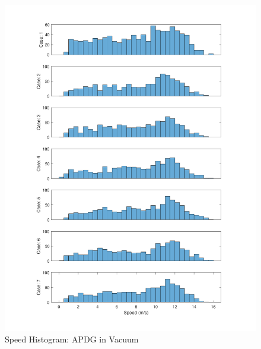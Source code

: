 \begin{figure}[H]
	\centering
	\begin{minipage}{4.3 in}
		\includegraphics[width=\linewidth]{Figures/hspddisppowvac.pdf}
		\caption{Speed Histogram: APDG in Vacuum \label{fig:hspddisppowvac} }
	\end{minipage}
\end{figure}

